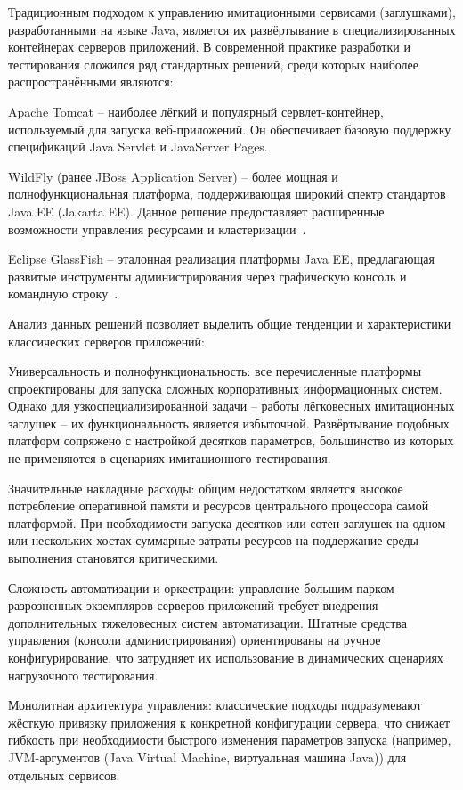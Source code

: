 Традиционным подходом к управлению имитационными сервисами (заглушками), разработанными на языке Java, является их развёртывание в специализированных контейнерах серверов приложений. В современной практике разработки и тестирования сложился ряд стандартных решений, среди которых наиболее распространёнными являются:

\begin{compactlist}
\item Apache Tomcat -- наиболее лёгкий и популярный сервлет-контейнер, используемый для запуска веб-приложений. Он обеспечивает базовую поддержку спецификаций Java Servlet и JavaServer Pages.
\item WildFly (ранее JBoss Application Server) -- более мощная и полнофункциональная платформа, поддерживающая широкий спектр стандартов Java EE (Jakarta EE). Данное решение предоставляет расширенные возможности управления ресурсами и кластеризации~\cite{wildfly}.
\item Eclipse GlassFish -- эталонная реализация платформы Java EE, предлагающая развитые инструменты администрирования через графическую консоль и командную строку~\cite{glassfish}.
\end{compactlist}

Анализ данных решений позволяет выделить общие тенденции и характеристики классических серверов приложений:

\begin{compactlist}
\item Универсальность и полнофункциональность: все перечисленные платформы спроектированы для запуска сложных корпоративных информационных систем. Однако для узкоспециализированной задачи -- работы лёгковесных имитационных заглушек -- их функциональность является избыточной. Развёртывание подобных платформ сопряжено с настройкой десятков параметров, большинство из которых не применяются в сценариях имитационного тестирования.
\item Значительные накладные расходы: общим недостатком является высокое потребление оперативной памяти и ресурсов центрального процессора самой платформой. При необходимости запуска десятков или сотен заглушек на одном или нескольких хостах суммарные затраты ресурсов на поддержание среды выполнения становятся критическими.
\item Сложность автоматизации и оркестрации: управление большим парком разрозненных экземпляров серверов приложений требует внедрения дополнительных тяжеловесных систем автоматизации. Штатные средства управления (консоли администрирования) ориентированы на ручное конфигурирование, что затрудняет их использование в динамических сценариях нагрузочного тестирования.
\item Монолитная архитектура управления: классические подходы подразумевают жёсткую привязку приложения к конкретной конфигурации сервера, что снижает гибкость при необходимости быстрого изменения параметров запуска (например, JVM-аргументов (Java Virtual Machine, виртуальная машина Java)) для отдельных сервисов.
\end{compactlist}

